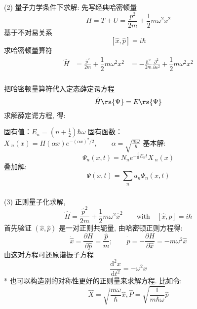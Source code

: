 \begin{frame}
    \frametitle{}
    \解 (2) 量子力学条件下求解: 先写经典哈密顿量
      \begin{equation*}
          H=T+U = \frac{p^2 }{2m} + \dfrac{1}{2} m \omega ^2 x^2 
      \end{equation*}	
      基于不对易关系
      \[ [\hat{x}, \hat{p}] =i\hbar\] 
      求哈密顿量算符
      \begin{equation*}
      \begin{aligned}
          \hat{H} &= \frac{\hat{p}^2 }{2m} + \dfrac{1}{2} m \omega ^2 x^2  
                 &= - \frac{\hbar ^2}{2m} \frac{\partial^2 }{\partial x^2 }+ \dfrac{1}{2} m \omega ^2 x^2   
      \end{aligned}
      \end{equation*}	
\end{frame}

\begin{frame}
    \frametitle{}
    把哈密顿量算符代入定态薛定谔方程
    \[ \hat{H}\rs{\Psi} =E \rs{\Psi} \]
    求解薛定谔方程, 得: 
    \begin{enumerate}
      \IItem 固有值：$\displaystyle  E_n=(n+\frac{1}{2})\hbar \omega $ 
      \IItem 固有函数：{$\displaystyle  X~_n(x)= H(\alpha x) e^{-(\alpha x)^2 /2 }, \qquad \alpha =\sqrt{\frac{m \omega }{\hbar}} $}
      \IItem 基本解:
      \[ \Psi_n(x,t) = N_n e^{-\frac{i}{\hbar} E_n t } X~_n(x)\]  
      \IItem 叠加解:
      \[ \Psi (x,t) = \sum_n a_n \Psi_n(x,t)\] 
  \end{enumerate}
\end{frame}

\begin{frame}
    \frametitle{}
    \解 (3) 正则量子化求解, 
  \begin{equation*}
      \hat{H} = \frac{\hat{p}^2 }{2m} + \dfrac{1}{2} m \omega ^2 \hat{x}^2   \qquad \text{with} \quad [\hat{x},\hat{p}]=i\hbar 
  \end{equation*}	
  首先验证 $(\hat{x},\hat{p})$ 是一对正则共轭量, 由哈密顿正则方程得: \\ 
  \[ \dot{\hat{x}} = \frac{\partial H }{\partial \hat{p} } =  \frac{{\hat{p}}}{m}; \qquad   \dot{\hat{p}} = - \frac{\partial H }{\partial \hat{x} } = -m \omega ^2 \hat{x} \]
  由这对方程可还原谐振子方程
  \[\frac{\mathrm{d}^2 x}{\mathrm{d} t ^2}  = - \omega^2 x\]
  * 也可以构造别的对称性更好的正则量来求解方程. 比如令: 
  \[ \hat{X} = \sqrt{\frac{m\omega}{\hbar}}\hat{x}, \hat{P} = \sqrt{\frac{1}{m \hbar \omega}} \hat{p} \]
\end{frame}


